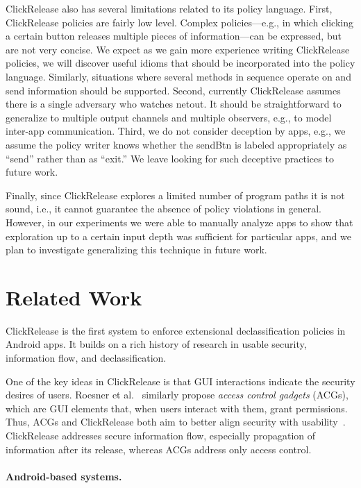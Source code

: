 \documentclass{llncs}
\newcommand{\code}[1]{\textsf{#1}} \newcommand{\bcode}[1]{\texttt{#1}}
\newcommand{\toolname}{ClickRelease\xspace}
\begin{document}
\toolname{} also has several limitations related to its policy
language. First, \toolname{} policies are fairly low level. Complex
policies---e.g., in which clicking a certain button releases
multiple pieces of information---can be expressed, but are not very
concise. We expect as we gain more experience writing \toolname{}
policies, we will discover useful idioms that should be incorporated
into the policy language.  Similarly, situations where several
methods in sequence operate on and send information should be
supported.  Second, currently \toolname{} assumes there
is a single adversary who watches \code{netout}. It should be
straightforward to generalize to multiple output channels and multiple
observers, e.g., to model inter-app communication.  Third, we do not
consider deception by apps, e.g., we assume the policy writer knows
whether the \code{sendBtn} is labeled appropriately as ``send'' rather
than as ``exit.'' We leave looking for such deceptive practices to
future work.

Finally, since \toolname{} explores a limited number of program paths
it is not sound, i.e., it cannot guarantee the absence of policy
violations in general. However, in our experiments we were able to
manually analyze apps to show that exploration up to a certain input
depth was sufficient for particular apps, and we plan to investigate
generalizing this technique in future work.

\section{Related Work}
\label{sec:related-work}

\toolname is the first system to enforce extensional declassification policies 
in Android apps.  It builds on a rich history of research in usable security,
information flow, and declassification.

One of the key ideas in \toolname is that GUI interactions indicate the 
security desires of users.
Roesner et al.~\cite{Roesner:12} similarly propose \emph{access control gadgets}
(ACGs), which are GUI elements that, when users interact with them,
grant permissions. 
Thus, ACGs and \toolname both aim to better align 
security with usability~\cite{Yee:04}.
\toolname addresses secure information flow, especially propagation of
information after its release, whereas ACGs address only access control.

\paragraph*{Android-based systems.}
\end{document}
